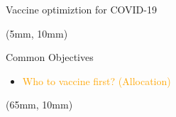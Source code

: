 \begin{frame}{Vaccine optimiztion for COVID-19}
    \begin{textblock*}{50mm}(5mm, 10mm)
        \begin{block}{Common Objectives}
           \begin{itemize}[label=$\mathbf{\star}$]
                \item
                    \textcolor<5>{orange}{
                        Who to vaccine first?
                        (Allocation)
                    }
            \end{itemize}
        \end{block}
    \end{textblock*}
%
    \begin{textblock*}{55mm}(65mm, 10mm)


\end{textblock*}
\end{frame}
